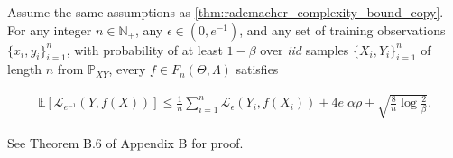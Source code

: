 \documentclass{llncs}
\begin{document}
	
	\begin{theorem}
		\label{thm:specific_expected_loss_bound_for_multiclass_conditional_embedding_copy}
		
		Assume the same assumptions as \cref{thm:rademacher_complexity_bound_copy}. For any integer $n \in \mathbb{N}_{+}$, any $\epsilon \in (0, e^{-1})$, and any set of training observations $\{x_{i}, y_{i}\}_{i = 1}^{n}$, with probability of at least $1 - \beta$ over \textit{iid} samples $\{X_{i}, Y_{i}\}_{i = 1}^{n}$ of length $n$ from $\mathbb{P}_{X Y}$, every $f \in F_{n}(\Theta, \Lambda)$ satisfies
		
		\begin{equation}
		\begin{aligned}
		\mathbb{E}[\mathcal{L}_{e^{-1}}(Y, f(X))] \leq \frac{1}{n} \sum_{i = 1}^{n} \mathcal{L}_{\epsilon}(Y_{i}, f(X_{i})) + 4 e \; \alpha \rho + \sqrt{\frac{8}{n} \log{\frac{2}{\beta}}}.
		\end{aligned}
		\label{eq:specific_expected_loss_bound_for_multiclass_conditional_embedding_copy}
		\end{equation}
		
		See Theorem B.6 of Appendix B for proof.
	\end{theorem}
	
\end{document}
